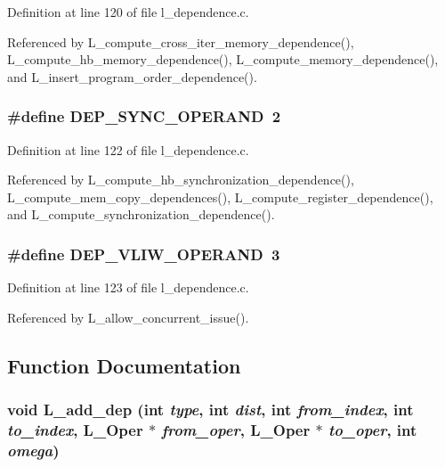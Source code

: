 Definition at line 120 of file l\_\-dependence.c.

Referenced by L\_\-compute\_\-cross\_\-iter\_\-memory\_\-dependence(), L\_\-compute\_\-hb\_\-memory\_\-dependence(), L\_\-compute\_\-memory\_\-dependence(), and L\_\-insert\_\-program\_\-order\_\-dependence().
\subsubsection{\setlength{\rightskip}{0pt plus 5cm}\#define DEP\_\-SYNC\_\-OPERAND~2}\label{l__dependence_8c_14c0cbe25fab7704fb5d4b491c096dab}




Definition at line 122 of file l\_\-dependence.c.

Referenced by L\_\-compute\_\-hb\_\-synchronization\_\-dependence(), L\_\-compute\_\-mem\_\-copy\_\-dependences(), L\_\-compute\_\-register\_\-dependence(), and L\_\-compute\_\-synchronization\_\-dependence().
\subsubsection{\setlength{\rightskip}{0pt plus 5cm}\#define DEP\_\-VLIW\_\-OPERAND~3}\label{l__dependence_8c_3326c6a5979f6eb3961e3d2142cd9b7f}




Definition at line 123 of file l\_\-dependence.c.

Referenced by L\_\-allow\_\-concurrent\_\-issue().

\subsection{Function Documentation}
\subsubsection{\setlength{\rightskip}{0pt plus 5cm}void L\_\-add\_\-dep (int {\em type}, int {\em dist}, int {\em from\_\-index}, int {\em to\_\-index}, L\_\-Oper $\ast$ {\em from\_\-oper}, L\_\-Oper $\ast$ {\em to\_\-oper}, int {\em omega})}\label{l__dependence_8c_8a84f01e6521a557413c06468f1faf33}




